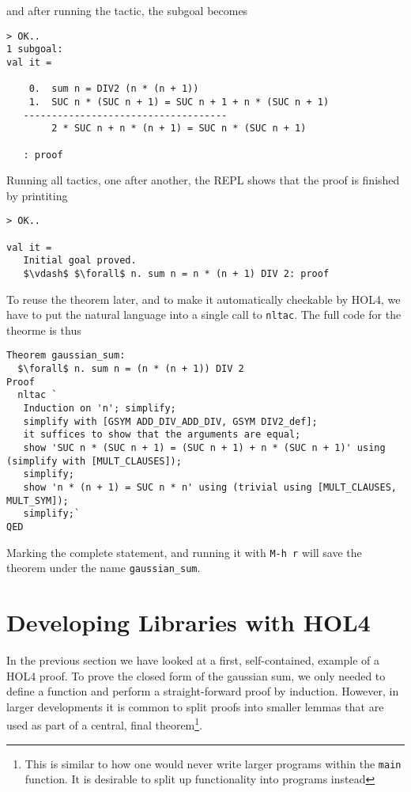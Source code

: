 \documentclass[10pt]{scrartcl}
\newcommand{\ekey}[1]{\texttt{#1}}
\begin{document}
and after running the tactic, the subgoal becomes
\begin{lstlisting}
> OK..
1 subgoal:
val it =

    0.  sum n = DIV2 (n * (n + 1))
    1.  SUC n * (SUC n + 1) = SUC n + 1 + n * (SUC n + 1)
   ------------------------------------
        2 * SUC n + n * (n + 1) = SUC n * (SUC n + 1)

   : proof
\end{lstlisting}

Running all tactics, one after another, the REPL shows that the proof is finished by printiting
\begin{lstlisting}
> OK..

val it =
   Initial goal proved.
   $\vdash$ $\forall$ n. sum n = n * (n + 1) DIV 2: proof
\end{lstlisting}

To reuse the theorem later, and to make it automatically checkable by HOL4, we
have to put the natural language into a single call to \lstinline{nltac}.
The full code for the theorme is thus
\begin{lstlisting}[mathescape=true]
Theorem gaussian_sum:
  $\forall$ n. sum n = (n * (n + 1)) DIV 2
Proof
  nltac `
   Induction on 'n'; simplify;
   simplify with [GSYM ADD_DIV_ADD_DIV, GSYM DIV2_def];
   it suffices to show that the arguments are equal;
   show 'SUC n * (SUC n + 1) = (SUC n + 1) + n * (SUC n + 1)' using (simplify with [MULT_CLAUSES]);
   simplify;
   show 'n * (n + 1) = SUC n * n' using (trivial using [MULT_CLAUSES, MULT_SYM]);
   simplify;`
QED
\end{lstlisting}

Marking the complete statement, and running it with \ekey{M-h r} will save the
theorem under the name \lstinline{gaussian_sum}.

\section{Developing Libraries with HOL4}

In the previous section we have looked at a first, self-contained, example of a
HOL4 proof.
To prove the closed form of the gaussian sum, we only needed to define a function
and perform a straight-forward proof by induction.
However, in larger developments it is common to split proofs into smaller
lemmas that are used as part of a central, final theorem\footnote{This is similar to how one would never write larger programs within the \texttt{main} function. It is desirable to split up functionality into programs instead}.
\end{document}

